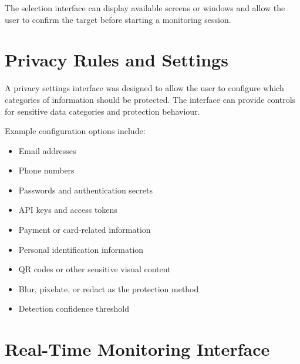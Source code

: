 \documentclass[12pt,a4paper]{article}
\begin{document}
The selection interface can display available screens or windows and allow the user
to confirm the target before starting a monitoring session.


\section{Privacy Rules and Settings}

A privacy settings interface was designed to allow the user to configure which categories
of information should be protected. The interface can provide controls for sensitive
data categories and protection behaviour.

Example configuration options include:

\begin{itemize}

    \item Email addresses

    \item Phone numbers

    \item Passwords and authentication secrets

    \item API keys and access tokens

    \item Payment or card-related information

    \item Personal identification information

    \item QR codes or other sensitive visual content

    \item Blur, pixelate, or redact as the protection method

    \item Detection confidence threshold

\end{itemize}


\section{Real-Time Monitoring Interface}
\end{document}
